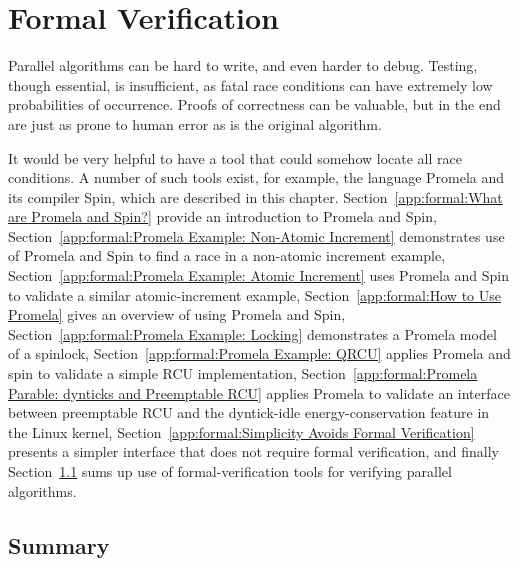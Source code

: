 
\chapter{Formal Verification}
\label{app:formal:Formal Verification}


Parallel algorithms can be hard to write, and even harder to debug.
Testing, though essential, is insufficient, as fatal race conditions
can have extremely low probabilities of occurrence.
Proofs of correctness can be valuable, but in the end are just as
prone to human error as is the original algorithm.

It would be very helpful to have a tool that could somehow locate
all race conditions.
A number of such tools exist, for example,
the language Promela and its compiler Spin, which are described in
this chapter.
Section~\ref{app:formal:What are Promela and Spin?} provide an
introduction to Promela and Spin,
Section~\ref{app:formal:Promela Example: Non-Atomic Increment}
demonstrates use of Promela and Spin to find a race in a non-atomic increment
example,
Section~\ref{app:formal:Promela Example: Atomic Increment}
uses Promela and Spin to validate a similar atomic-increment example,
Section~\ref{app:formal:How to Use Promela}
gives an overview of using Promela and Spin,
Section~\ref{app:formal:Promela Example: Locking}
demonstrates a Promela model of a spinlock,
Section~\ref{app:formal:Promela Example: QRCU}
applies Promela and spin to validate a simple RCU implementation,
Section~\ref{app:formal:Promela Parable: dynticks and Preemptable RCU}
applies Promela to validate an interface between preemptable RCU and
the dyntick-idle energy-conservation feature in the Linux kernel,
Section~\ref{app:formal:Simplicity Avoids Formal Verification}
presents a simpler interface that does not require formal verification,
and finally
Section~\ref{app:formal:Summary}
sums up use of formal-verification tools for verifying parallel algorithms.




\section{Summary}
\label{app:formal:Summary}

